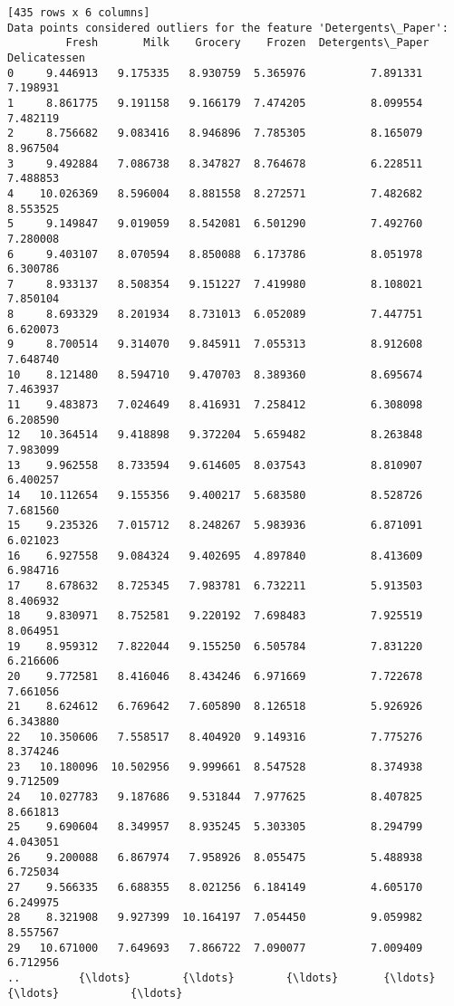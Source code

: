 \documentclass[11pt]{article}
\begin{document}
\begin{Verbatim}[commandchars=\\\{\}]
[435 rows x 6 columns]
Data points considered outliers for the feature 'Detergents\_Paper':
         Fresh       Milk    Grocery    Frozen  Detergents\_Paper  Delicatessen
0     9.446913   9.175335   8.930759  5.365976          7.891331      7.198931
1     8.861775   9.191158   9.166179  7.474205          8.099554      7.482119
2     8.756682   9.083416   8.946896  7.785305          8.165079      8.967504
3     9.492884   7.086738   8.347827  8.764678          6.228511      7.488853
4    10.026369   8.596004   8.881558  8.272571          7.482682      8.553525
5     9.149847   9.019059   8.542081  6.501290          7.492760      7.280008
6     9.403107   8.070594   8.850088  6.173786          8.051978      6.300786
7     8.933137   8.508354   9.151227  7.419980          8.108021      7.850104
8     8.693329   8.201934   8.731013  6.052089          7.447751      6.620073
9     8.700514   9.314070   9.845911  7.055313          8.912608      7.648740
10    8.121480   8.594710   9.470703  8.389360          8.695674      7.463937
11    9.483873   7.024649   8.416931  7.258412          6.308098      6.208590
12   10.364514   9.418898   9.372204  5.659482          8.263848      7.983099
13    9.962558   8.733594   9.614605  8.037543          8.810907      6.400257
14   10.112654   9.155356   9.400217  5.683580          8.528726      7.681560
15    9.235326   7.015712   8.248267  5.983936          6.871091      6.021023
16    6.927558   9.084324   9.402695  4.897840          8.413609      6.984716
17    8.678632   8.725345   7.983781  6.732211          5.913503      8.406932
18    9.830971   8.752581   9.220192  7.698483          7.925519      8.064951
19    8.959312   7.822044   9.155250  6.505784          7.831220      6.216606
20    9.772581   8.416046   8.434246  6.971669          7.722678      7.661056
21    8.624612   6.769642   7.605890  8.126518          5.926926      6.343880
22   10.350606   7.558517   8.404920  9.149316          7.775276      8.374246
23   10.180096  10.502956   9.999661  8.547528          8.374938      9.712509
24   10.027783   9.187686   9.531844  7.977625          8.407825      8.661813
25    9.690604   8.349957   8.935245  5.303305          8.294799      4.043051
26    9.200088   6.867974   7.958926  8.055475          5.488938      6.725034
27    9.566335   6.688355   8.021256  6.184149          4.605170      6.249975
28    8.321908   9.927399  10.164197  7.054450          9.059982      8.557567
29   10.671000   7.649693   7.866722  7.090077          7.009409      6.712956
..         {\ldots}        {\ldots}        {\ldots}       {\ldots}               {\ldots}           {\ldots}

\end{Verbatim}
\end{document}
